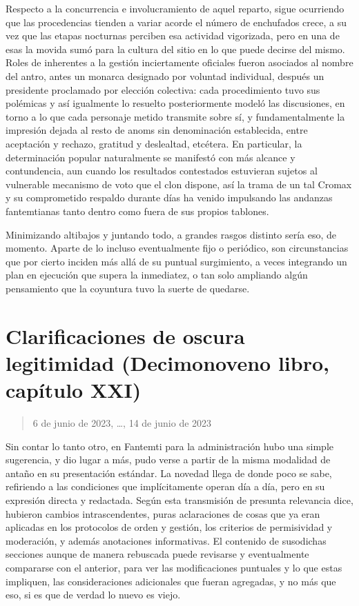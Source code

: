 \documentclass[
]{book}
\begin{document}
Respecto a la concurrencia e involucramiento de aquel reparto, sigue ocurriendo que las procedencias tienden a variar acorde el número de enchufados crece, a su vez que las etapas nocturnas perciben esa actividad vigorizada, pero en una de esas la movida sumó para la cultura del sitio en lo que puede decirse del mismo. Roles de inherentes a la gestión inciertamente oficiales fueron asociados al nombre del antro, antes un monarca designado por voluntad individual, después un presidente proclamado por elección colectiva: cada procedimiento tuvo sus polémicas y así igualmente lo resuelto posteriormente modeló las discusiones, en torno a lo que cada personaje metido transmite sobre sí, y fundamentalmente la impresión dejada al resto de anoms sin denominación establecida, entre aceptación y rechazo, gratitud y deslealtad, etcétera. En particular, la determinación popular naturalmente se manifestó con más alcance y contundencia, aun cuando los resultados contestados estuvieran sujetos al vulnerable mecanismo de voto que el clon dispone, así la trama de un tal Cromax y su comprometido respaldo durante días ha venido impulsando las andanzas fantemtianas tanto dentro como fuera de sus propios tablones.

Minimizando altibajos y juntando todo, a grandes rasgos distinto sería eso, de momento. Aparte de lo incluso eventualmente fijo o periódico, son circunstancias que por cierto inciden más allá de su puntual surgimiento, a veces integrando un plan en ejecución que supera la inmediatez, o tan solo ampliando algún pensamiento que la coyuntura tuvo la suerte de quedarse.

\hypertarget{clarificaciones-de-oscura-legitimidad-decimonoveno-libro-capuxedtulo-xxi}{%
\section{Clarificaciones de oscura legitimidad (Decimonoveno libro, capítulo XXI)}\label{clarificaciones-de-oscura-legitimidad-decimonoveno-libro-capuxedtulo-xxi}}

\begin{quote}
6 de junio de 2023, \ldots, 14 de junio de 2023
\end{quote}

Sin contar lo tanto otro, en Fantemti para la administración hubo una simple sugerencia, y dio lugar a más, pudo verse a partir de la misma modalidad de antaño en su presentación estándar. La novedad llega de donde poco se sabe, refiriendo a las condiciones que implícitamente operan día a día, pero en su expresión directa y redactada. Según esta transmisión de presunta relevancia dice, hubieron cambios intrascendentes, puras aclaraciones de cosas que ya eran aplicadas en los protocolos de orden y gestión, los criterios de permisividad y moderación, y además anotaciones informativas. El contenido de susodichas secciones aunque de manera rebuscada puede revisarse y eventualmente compararse con el anterior, para ver las modificaciones puntuales y lo que estas impliquen, las consideraciones adicionales que fueran agregadas, y no más que eso, si es que de verdad lo nuevo es viejo.
\end{document}
